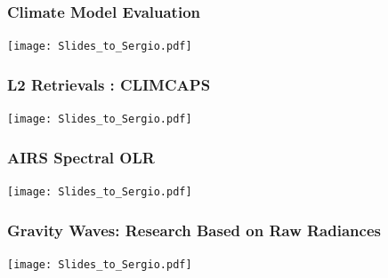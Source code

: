 \documentclass[10pt,t]{beamer}
\begin{document}
\begin{frame}
\frametitle{Climate Model Evaluation}  
\vspace{-0.35in}
\begin{center}
\texttt{[image: Slides\_to\_Sergio.pdf]}
\end{center}
\end{frame}
\begin{frame}
\frametitle{L2 Retrievals : CLIMCAPS}  
\vspace{-0.35in}
\begin{center}
\texttt{[image: Slides\_to\_Sergio.pdf]}
\end{center}
\end{frame}
\begin{frame}
\frametitle{AIRS Spectral OLR}  
\vspace{-0.35in}
\begin{center}
\texttt{[image: Slides\_to\_Sergio.pdf]}
\end{center}
\end{frame}
\begin{frame}
\frametitle{Gravity Waves: Research Based on Raw Radiances}  
\vspace{-0.35in}
\begin{center}
\texttt{[image: Slides\_to\_Sergio.pdf]}
\end{center}
\end{frame}
\end{document}
